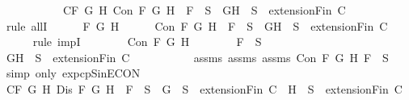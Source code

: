 \begin{isabellebody}
\ \ \ \ \isamarkupfalse%
\isanewline
\ \ \isamarkupfalse%
\isanewline
\ \ \isamarkupfalse%
\ C{}{\isacharcolon}{\isachardoublequoteopen}{\isasymforall}F\ G\ H{\isachardot}\ Con\ F\ G\ H\ {\isasymlongrightarrow}\ F\ {\isasymin}\ S\ {\isasymlongrightarrow}\ {\isacharbraceleft}G{\isacharcomma}H{\isacharbraceright}\ {\isasymunion}\ S\ {\isasymin}\ {\isacharparenleft}extensionFin\ C{\isacharparenright}{\isachardoublequoteclose}\isanewline
\ \ \isamarkupfalse%
\ {\isacharparenleft}rule\ allI{\isacharparenright}{\isacharplus}\isanewline
\ \ \ \ \isamarkupfalse%
\ F\ G\ H\isanewline
\ \ \ \ \isamarkupfalse%
\ {\isachardoublequoteopen}Con\ F\ G\ H\ {\isasymlongrightarrow}\ F\ {\isasymin}\ S\ {\isasymlongrightarrow}\ {\isacharbraceleft}G{\isacharcomma}H{\isacharbraceright}\ {\isasymunion}\ S\ {\isasymin}\ {\isacharparenleft}extensionFin\ C{\isacharparenright}{\isachardoublequoteclose}\isanewline
\ \ \ \ \isamarkupfalse%
\ {\isacharparenleft}rule\ impI{\isacharparenright}{\isacharplus}\isanewline
\ \ \ \ \ \ \isamarkupfalse%
\ {\isachardoublequoteopen}Con\ F\ G\ H{\isachardoublequoteclose}\isanewline
\ \ \ \ \ \ \isamarkupfalse%
\ {\isachardoublequoteopen}F\ {\isasymin}\ S{\isachardoublequoteclose}\ \isanewline
\ \ \ \ \ \ \isamarkupfalse%
\ {\isachardoublequoteopen}{\isacharbraceleft}G{\isacharcomma}H{\isacharbraceright}\ {\isasymunion}\ S\ {\isasymin}\ {\isacharparenleft}extensionFin\ C{\isacharparenright}{\isachardoublequoteclose}\ \isanewline
\ \ \ \ \ \ \ \ \isamarkupfalse%
\ assms{\isacharparenleft}{}{\isacharparenright}\ assms{\isacharparenleft}{}{\isacharparenright}\ assms{\isacharparenleft}{}{\isacharparenright}\ {\isacartoucheopen}Con\ F\ G\ H{\isacartoucheclose}\ {\isacartoucheopen}F\ {\isasymin}\ S{\isacartoucheclose}\ \isamarkupfalse%
\ {\isacharparenleft}simp\ only{\isacharcolon}\ ex{}{\isacharunderscore}pcp{\isacharunderscore}SinE{\isacharunderscore}CON{\isacharparenright}\isanewline
\ \ \ \ \isamarkupfalse%
\isanewline
\ \ \isamarkupfalse%
\isanewline
\ \ \isamarkupfalse%
\ C{}{\isacharcolon}{\isachardoublequoteopen}{\isasymforall}F\ G\ H{\isachardot}\ Dis\ F\ G\ H\ {\isasymlongrightarrow}\ F\ {\isasymin}\ S\ {\isasymlongrightarrow}\ {\isacharbraceleft}G{\isacharbraceright}\ {\isasymunion}\ S\ {\isasymin}\ {\isacharparenleft}extensionFin\ C{\isacharparenright}\ {\isasymor}\ {\isacharbraceleft}H{\isacharbraceright}\ {\isasymunion}\ S\ {\isasymin}\ {\isacharparenleft}extensionFin\ C{\isacharparenright}{\isachardoublequoteclose}\isanewline

\end{isabellebody}
